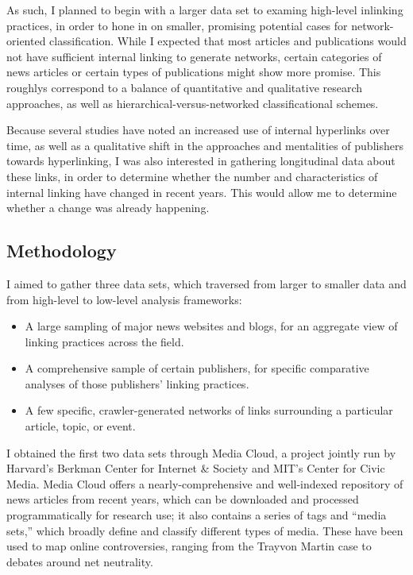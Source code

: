 As such, I planned to begin with a larger data set to examing high-level inlinking practices, in order to hone in on smaller, promising potential cases for network-oriented classification. While I expected that most articles and publications would not have sufficient internal linking to generate networks, certain categories of news articles or certain types of publications might show more promise. This roughlys correspond to a balance of quantitative and qualitative research approaches, as well as hierarchical-versus-networked classificational schemes.

Because several studies have noted an increased use of internal hyperlinks over time, as well as a qualitative shift in the approaches and mentalities of publishers towards hyperlinking, I was also interested in gathering longitudinal data about these links, in order to determine whether the number and characteristics of internal linking have changed in recent years. This would allow me to determine whether a change was already happening.

\subsection{Methodology}

I aimed to gather three data sets, which traversed from larger to smaller data and from high-level to low-level analysis frameworks:\begin{itemize}
\item A large sampling of major news websites and blogs, for an aggregate view of linking practices across the field.
\item A comprehensive sample of certain publishers, for specific comparative analyses of those publishers' linking practices.
\item A few specific, crawler-generated networks of links surrounding a particular article, topic, or event.\end{itemize}

\noindent I obtained the first two data sets through Media Cloud, a project jointly run by Harvard's Berkman Center for Internet \& Society and MIT's Center for Civic Media. Media Cloud offers a nearly-comprehensive and well-indexed repository of news articles from recent years, which can be downloaded and processed programmatically for research use; it also contains a series of tags and ``media sets,'' which broadly define and classify different types of media. These have been used to map online controversies, ranging from the Trayvon Martin case to debates around net neutrality.\autocite[See][]{benkler_social_2013,graeff_battle_2014}

